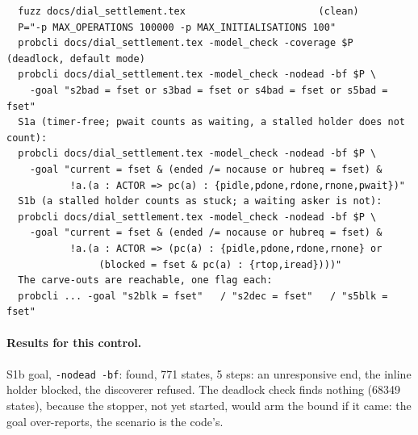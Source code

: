 \documentclass[a4paper,10pt,fleqn]{article}
\begin{document}
\begin{verbatim}
  fuzz docs/dial_settlement.tex                       (clean)
  P="-p MAX_OPERATIONS 100000 -p MAX_INITIALISATIONS 100"
  probcli docs/dial_settlement.tex -model_check -coverage $P          (deadlock, default mode)
  probcli docs/dial_settlement.tex -model_check -nodead -bf $P \
    -goal "s2bad = fset or s3bad = fset or s4bad = fset or s5bad = fset"
  S1a (timer-free; pwait counts as waiting, a stalled holder does not count):
  probcli docs/dial_settlement.tex -model_check -nodead -bf $P \
    -goal "current = fset & (ended /= nocause or hubreq = fset) &
           !a.(a : ACTOR => pc(a) : {pidle,pdone,rdone,rnone,pwait})"
  S1b (a stalled holder counts as stuck; a waiting asker is not):
  probcli docs/dial_settlement.tex -model_check -nodead -bf $P \
    -goal "current = fset & (ended /= nocause or hubreq = fset) &
           !a.(a : ACTOR => (pc(a) : {pidle,pdone,rdone,rnone} or
                (blocked = fset & pc(a) : {rtop,iread})))"
  The carve-outs are reachable, one flag each:
  probcli ... -goal "s2blk = fset"   / "s2dec = fset"   / "s5blk = fset"
\end{verbatim}

\paragraph{Results for this control.}
S1b goal, \texttt{-nodead -bf}: found, 771 states, 5 steps: an unresponsive end,
the inline holder blocked, the discoverer refused.  The deadlock check finds
nothing (68349 states), because the stopper, not yet started, would arm the bound
if it came: the goal over-reports, the scenario is the code's.
\end{document}
